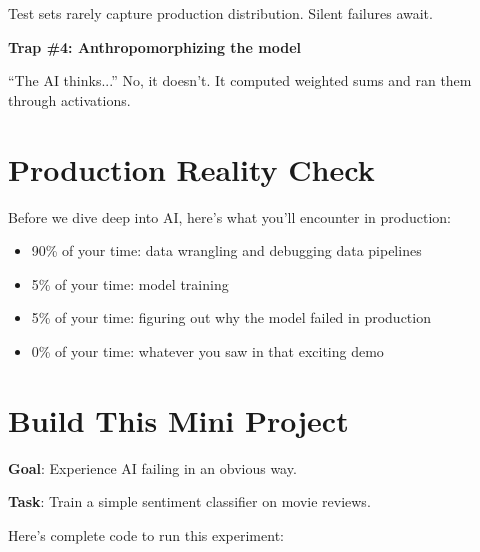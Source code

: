 \documentclass[11pt,oneside]{book}
\begin{document}
Test sets rarely capture production distribution. Silent failures await.

\textbf{Trap \#4: Anthropomorphizing the model}

``The AI thinks...'' No, it doesn't. It computed weighted sums and ran them through activations.

\section{Production Reality Check}

Before we dive deep into AI, here's what you'll encounter in production:

\begin{itemize}
\item 90\% of your time: data wrangling and debugging data pipelines
\item 5\% of your time: model training
\item 5\% of your time: figuring out why the model failed in production
\item 0\% of your time: whatever you saw in that exciting demo
\end{itemize}

\section{Build This Mini Project}

\textbf{Goal}: Experience AI failing in an obvious way.

\textbf{Task}: Train a simple sentiment classifier on movie reviews.

Here's complete code to run this experiment:
\end{document}
